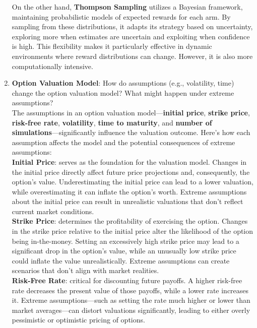 \documentclass[12pt]{exam}
\begin{document}
\begin{questions}
\begin{enumerate}
    On the other hand, \textbf{Thompson Sampling} utilizes a Bayesian framework, maintaining probabilistic models of expected rewards for each arm. By sampling from these distributions, it adapts its strategy based on uncertainty, exploring more when estimates are uncertain and exploiting when confidence is high. This flexibility makes it particularly effective in dynamic environments where reward distributions can change. However, it is also more computationally intensive.\\
    
    \item \textbf{Option Valuation Model}: How do assumptions (e.g., volatility, time) change the option valuation model? What might happen under extreme assumptions?\\

    The assumptions in an option valuation model—\textbf{initial price}, \textbf{strike price}, \textbf{risk-free rate}, \textbf{volatility}, \textbf{time to maturity}, and \textbf{number of simulations}—significantly influence the valuation outcome. Here's how each assumption affects the model and the potential consequences of extreme assumptions: \\

    \textbf{Initial Price}: serves as the foundation for the valuation model. Changes in the initial price directly affect future price projections and, consequently, the option's value. Underestimating the initial price can lead to a lower valuation, while overestimating it can inflate the option's worth. Extreme assumptions about the initial price can result in unrealistic valuations that don’t reflect current market conditions.\\

    \textbf{Strike Price}: determines the profitability of exercising the option. Changes in the strike price relative to the initial price alter the likelihood of the option being in-the-money. Setting an excessively high strike price may lead to a significant drop in the option’s value, while an unusually low strike price could inflate the value unrealistically. Extreme assumptions can create scenarios that don’t align with market realities.\\

    
    \textbf{Risk-Free Rate}: critical for discounting future payoffs. A higher risk-free rate decreases the present value of those payoffs, while a lower rate increases it. Extreme assumptions—such as setting the rate much higher or lower than market averages—can distort valuations significantly, leading to either overly pessimistic or optimistic pricing of options.\\


\end{enumerate}
\end{questions}
\end{document}
